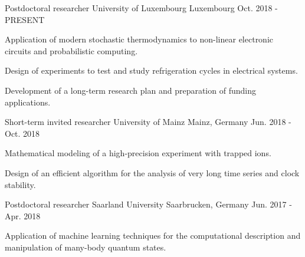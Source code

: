 

\begin{cventries}

  \cventry
    {Postdoctoral researcher} %
    {University of Luxembourg} %
    {Luxembourg} %
    {Oct. 2018 - PRESENT} %
    {
      \begin{cvitems} %
        \item {Application of modern stochastic thermodynamics to non-linear electronic circuits and probabilistic computing.}
        \item {Design of experiments to test and study refrigeration cycles in electrical systems.}
        \item {Development of a long-term research plan and preparation of funding applications.}
      \end{cvitems}
    }

  \cventry
    {Short-term invited researcher} %
    {University of Mainz} %
    {Mainz, Germany} %
    {Jun. 2018 - Oct. 2018} %
    {
      \begin{cvitems} %
        \item Mathematical modeling of a high-precision experiment with trapped ions.
        \item Design of an efficient algorithm for the analysis of very long time series and clock stability.
      \end{cvitems}
    }

  \cventry
    {Postdoctoral researcher} %
    {Saarland University} %
    {Saarbrucken, Germany} %
    {Jun. 2017 - Apr. 2018} %
    {
      \begin{cvitems} %
        \item Application of machine learning techniques for the computational
        description and manipulation of many-body quantum states.
      \end{cvitems}
    }


\end{cventries}
